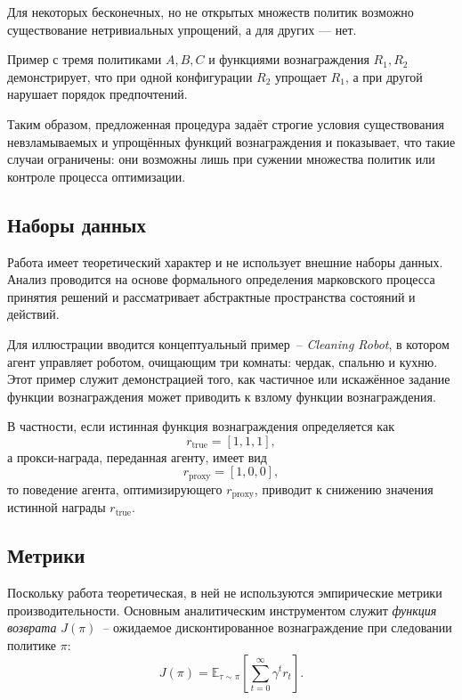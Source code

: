 Для некоторых бесконечных, но не открытых множеств политик возможно существование нетривиальных упрощений, а для других — нет.  

Пример с тремя политиками $A, B, C$ и функциями вознаграждения $R_1, R_2$ демонстрирует, что при одной конфигурации $R_2$ упрощает $R_1$, а при другой нарушает порядок предпочтений.

Таким образом, предложенная процедура задаёт строгие условия существования невзламываемых и упрощённых функций вознаграждения и показывает, что такие случаи ограничены: они возможны лишь при сужении множества политик или контроле процесса оптимизации.



\subsection{Наборы данных}

Работа имеет теоретический характер и не использует внешние наборы данных.  Анализ проводится на основе формального определения марковского процесса принятия решений и рассматривает абстрактные пространства состояний и действий.  

Для иллюстрации вводится концептуальный пример~-- \emph{Cleaning Robot},  
в котором агент управляет роботом, очищающим три комнаты: чердак, спальню и кухню.  
Этот пример служит демонстрацией того, как частичное или искажённое задание функции вознаграждения может приводить к взлому функции вознаграждения.  

В частности, если истинная функция вознаграждения определяется как
\begin{equation}
r_{\text{true}} = [1, 1, 1],
\end{equation}
а прокси-награда, переданная агенту, имеет вид
\begin{equation}
r_{\text{proxy}} = [1, 0, 0],
\end{equation}
то поведение агента, оптимизирующего $r_{\text{proxy}}$, приводит к снижению значения истинной награды $r_{\text{true}}$.


\subsection{Метрики}

Поскольку работа теоретическая, в ней не используются эмпирические метрики производительности.  
Основным аналитическим инструментом служит \emph{функция возврата} $J(\pi)$~-- ожидаемое дисконтированное вознаграждение при следовании политике $\pi$:
\begin{equation}
J(\pi) = \mathbb{E}_{\tau \sim \pi}\left[\sum_{t=0}^{\infty} \gamma^t r_t \right].
\end{equation}

